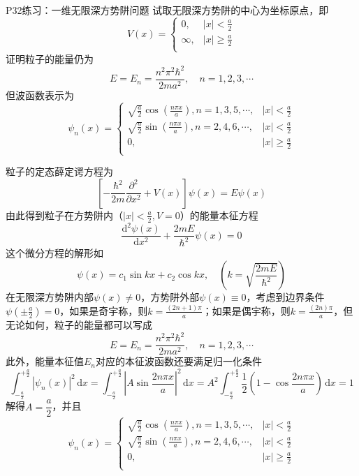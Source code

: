 \begin{question}{P32练习：一维无限深方势阱问题}
    试取无限深方势阱的中心为坐标原点，即
    $$
        V(x)=\begin{cases}
            0,      & |x|<\frac{a}{2}          \\
            \infty, & |x|\geqslant \frac{a}{2} \\
        \end{cases}
    $$
    证明粒子的能量仍为
    $$
        E = E_n = \frac{n^2\pi^2\hbar^2}{2ma^2}, \quad n=1,2,3,\cdots
    $$
    但波函数表示为
    $$
        \psi_n(x) = \begin{cases}
            \sqrt{\frac{a}{2}}\cos\left(\frac{n\pi x}{a}\right), n=1,3,5,\cdots, & |x|<\frac{a}{2}         \\
            \sqrt{\frac{a}{2}}\sin\left(\frac{n\pi x}{a}\right), n=2,4,6,\cdots, & |x|<\frac{a}{2}         \\
            0,                                                                   & |x|\geqslant\frac{a}{2} \\
        \end{cases}
    $$
\end{question}
\begin{solution}
    粒子的定态薛定谔方程为
    $$
        \left[-\frac{\hbar^2}{2m}\frac{\partial^2}{\partial x^2}+V(x)\right]\psi(x) = E\psi(x)
    $$
    由此得到粒子在方势阱内（$|x|<\frac{a}{2}, V=0$）的能量本征方程
    $$
        \frac{\mathrm{d}^2\psi(x)}{\mathrm{d}x^2}+\frac{2mE}{\hbar^2}\psi(x)=0
    $$
    这个微分方程的解形如
    $$
        \psi(x)=c_1\sin{kx}+c_2\cos{kx},
        \quad
        \left(k=\sqrt{\frac{2mE}{\hbar^2}}\right)
    $$
    在无限深方势阱内部$\psi(x)\neq0$，方势阱外部$\psi(x)\equiv0$，考虑到边界条件$\psi\left(\pm\frac{a}{2}\right)=0$，如果是奇宇称，则$k=\frac{(2n+1)\pi}{a}$；如果是偶宇称，则$k=\frac{(2n)\pi}{a}$，但无论如何，粒子的能量都可以写成
    $$
        E=E_n=\frac{n^2\pi^2\hbar^2}{2ma^2}, \quad n=1, 2, 3, \cdots
    $$
    此外，能量本征值$E_n$对应的本征波函数还要满足归一化条件
    $$
        \int_{-\frac{a}{2}}^{+\frac{a}{2}}|\psi_n(x)|^2\,\mathrm{d}x
        = \int_{-\frac{a}{2}}^{+\frac{a}{2}}\left|A\sin\frac{2n\pi x}{a}\right|^2\,\mathrm{d}x
        = A^2\int_{-\frac{a}{2}}^{+\frac{a}{2}}\frac{1}{2}\left(1-\cos\frac{2n\pi x}{a}\right)\,\mathrm{d}x
        = 1
    $$
    解得$A=\dfrac{a}{2}$，并且 %
    $$
        \psi_n(x) = \begin{cases}
            \sqrt{\frac{a}{2}}\cos\left(\frac{n\pi x}{a}\right), n=1,3,5,\cdots, & |x|<\frac{a}{2}         \\
            \sqrt{\frac{a}{2}}\sin\left(\frac{n\pi x}{a}\right), n=2,4,6,\cdots, & |x|<\frac{a}{2}         \\
            0,                                                                   & |x|\geqslant\frac{a}{2} \\
        \end{cases}
    $$
\end{solution}




